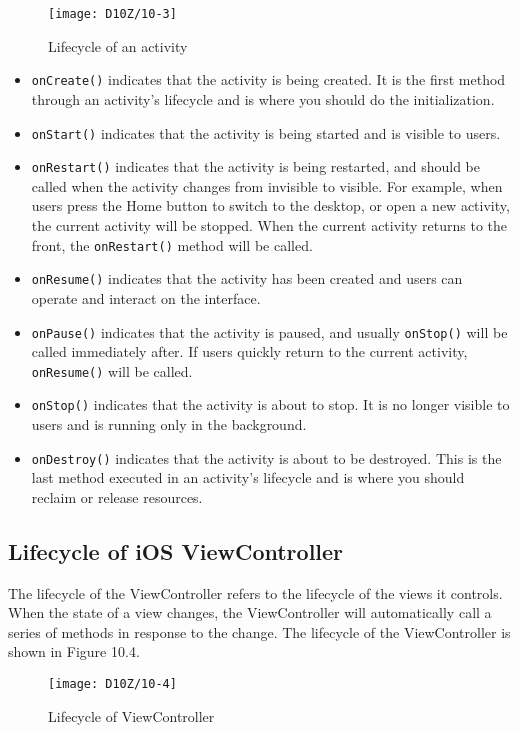 \documentclass[a4paper,12pt]{book}
\begin{document}
\begin{figure}[ht]
    \centering
    \texttt{[image: D10Z/10-3]}
    \caption{Lifecycle of an activity}
\end{figure}

\begin{itemize}
    \item \verb|onCreate()| indicates that the activity is being created. It is the first method through an activity’s lifecycle and is where you should do the initialization.
    \item \verb|onStart()| indicates that the activity is being started and is visible to users.
    \item \verb|onRestart()| indicates that the activity is being restarted, and should be called when the activity changes from invisible to visible. For example, when users press the Home button to switch to the desktop, or open a new activity, the current activity will be stopped. When the current activity returns to the front, the \verb|onRestart()| method will be called.
    \item \verb|onResume()| indicates that the activity has been created and users can operate and interact on the interface.
    \item \verb|onPause()| indicates that the activity is paused, and usually \verb|onStop()| will be called immediately after. If users quickly return to the current activity, \verb|onResume()| will be called.
    \item \verb|onStop()| indicates that the activity is about to stop. It is no longer visible to users and is running only in the background.
    \item \verb|onDestroy()| indicates that the activity is about to be destroyed. This is the last method executed in an activity’s lifecycle and is where you should reclaim or release resources.
\end{itemize}

\subsection{Lifecycle of iOS ViewController}
The lifecycle of the ViewController refers to the lifecycle of the views it controls. When the state of a view changes, the ViewController will automatically call a series of methods in response to the change. The lifecycle of the ViewController is shown in Figure 10.4.

\begin{figure}[ht]
    \centering
    \texttt{[image: D10Z/10-4]}
    \caption{Lifecycle of ViewController}
\end{figure}
\end{document}
